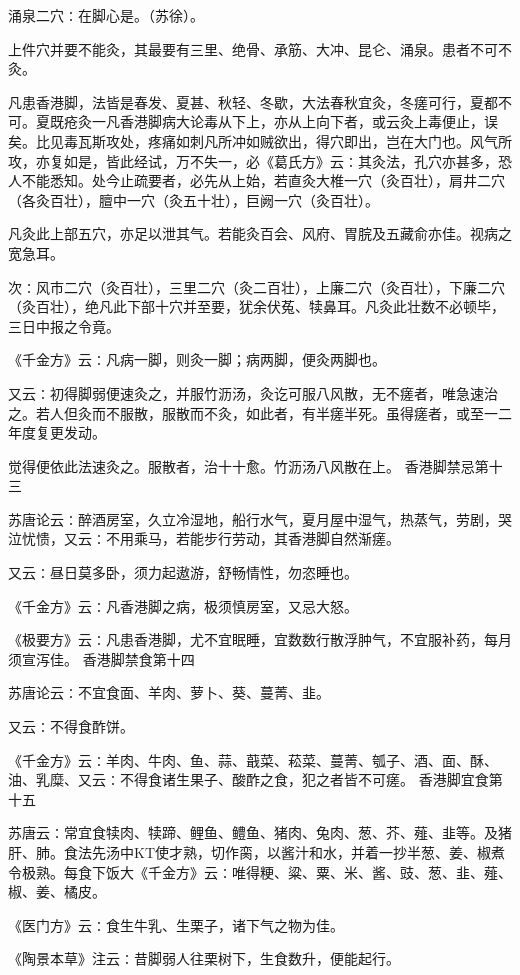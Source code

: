 \documentclass[a4paper,12pt,UTF8,twoside]{ctexbook}
\begin{document}
涌泉二穴∶在脚心是。（苏徐）。

上件穴并要不能灸，其最要有三里、绝骨、承筋、大冲、昆仑、涌泉。患者不可不灸。

凡患香港脚，法皆是春发、夏甚、秋轻、冬歇，大法春秋宜灸，冬瘥可行，夏都不可。夏既疮灸一凡香港脚病大论毒从下上，亦从上向下者，或云灸上毒便止，误矣。比见毒瓦斯攻处，疼痛如刺凡所冲如贼欲出，得穴即出，岂在大门也。风气所攻，亦复如是，皆此经试，万不失一，必《葛氏方》云∶其灸法，孔穴亦甚多，恐人不能悉知。处今止疏要者，必先从上始，若直灸大椎一穴（灸百壮），肩井二穴（各灸百壮），膻中一穴（灸五十壮），巨阙一穴（灸百壮）。

凡灸此上部五穴，亦足以泄其气。若能灸百会、风府、胃脘及五藏俞亦佳。视病之宽急耳。

次∶风市二穴（灸百壮），三里二穴（灸二百壮），上廉二穴（灸百壮），下廉二穴（灸百壮），绝凡此下部十穴并至要，犹余伏菟、犊鼻耳。凡灸此壮数不必顿毕，三日中报之令竟。

《千金方》云∶凡病一脚，则灸一脚；病两脚，便灸两脚也。

又云∶初得脚弱便速灸之，并服竹沥汤，灸讫可服八风散，无不瘥者，唯急速治之。若人但灸而不服散，服散而不灸，如此者，有半瘥半死。虽得瘥者，或至一二年度复更发动。

觉得便依此法速灸之。服散者，治十十愈。竹沥汤八风散在上。
香港脚禁忌第十三

苏唐论云∶醉酒房室，久立冷湿地，船行水气，夏月屋中湿气，热蒸气，劳剧，哭泣忧愦，又云∶不用乘马，若能步行劳动，其香港脚自然渐瘥。

又云∶昼日莫多卧，须力起遨游，舒畅情性，勿恣睡也。

《千金方》云∶凡香港脚之病，极须慎房室，又忌大怒。

《极要方》云∶凡患香港脚，尤不宜眠睡，宜数数行散浮肿气，不宜服补药，每月须宣泻佳。
香港脚禁食第十四

苏唐论云∶不宜食面、羊肉、萝卜、葵、蔓菁、韭。

又云∶不得食酢饼。

《千金方》云∶羊肉、牛肉、鱼、蒜、蕺菜、菘菜、蔓菁、瓠子、酒、面、酥、油、乳糜、又云∶不得食诸生果子、酸酢之食，犯之者皆不可瘥。
香港脚宜食第十五

苏唐云∶常宜食犊肉、犊蹄、鲤鱼、鳢鱼、猪肉、兔肉、葱、芥、薤、韭等。及猪肝、肺。食法先汤中KT使才熟，切作脔，以酱汁和水，并着一抄半葱、姜、椒煮令极熟。每食下饭大《千金方》云∶唯得粳、粱、粟、米、酱、豉、葱、韭、薤、椒、姜、橘皮。

《医门方》云∶食生牛乳、生栗子，诸下气之物为佳。

《陶景本草》注云∶昔脚弱人往栗树下，生食数升，便能起行。
\end{document}

